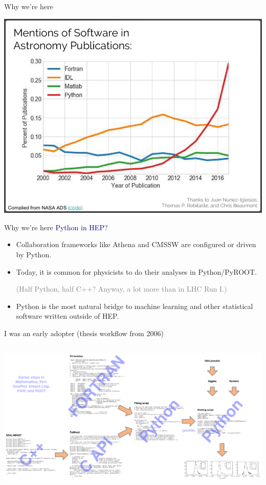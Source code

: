 \documentclass[aspectratio=169]{beamer}
\begin{document}
\begin{frame}{Why we're here}
\vspace{0.25 cm}
\begin{center}
\includegraphics[width=0.7\linewidth]{mentions-of-programming-languages.png}
\end{center}
\end{frame}

\begin{frame}{Why we're here}
\large
\vspace{0.5 cm}
\textcolor{darkblue}{\huge Python in HEP?}

\vspace{0.5 cm}
\begin{itemize}\setlength{\itemsep}{0.5 cm}
\item<2-> Collaboration frameworks like Athena and CMSSW are configured or driven by Python.

\item<3-> Today, it is common for physicists to do their analyses in Python/PyROOT.

\vspace{0.1 cm}
\textcolor{gray}{\normalsize (Half Python, half C++? Anyway, a lot more than in LHC Run I.)}

\item<4-> Python is the most natural bridge to machine learning and other statistical software written outside of HEP.
\end{itemize}
\end{frame}

\begin{frame}{I was an early adopter (thesis workflow from 2006)}
\vspace{0.5 cm}
\begin{columns}
\includegraphics[width=\linewidth]{jims-old-code/thesis-code-flow.pdf}
\end{columns}
\end{frame}
\end{document}
